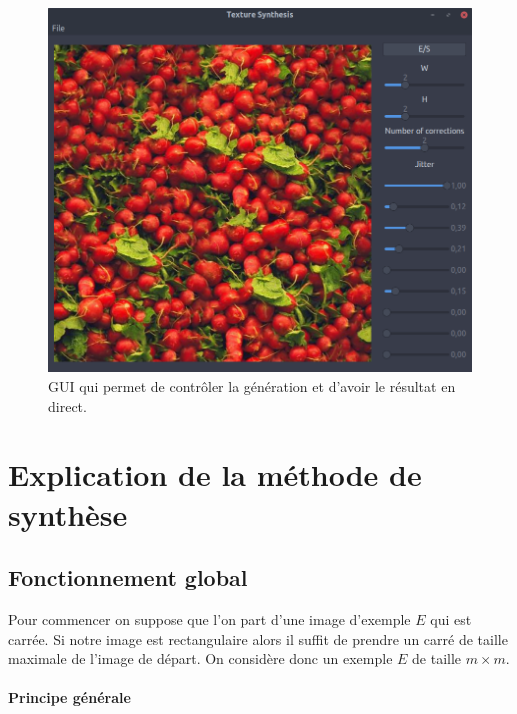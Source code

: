 \documentclass[12pt]{article}
\begin{document}
\begin{figure}
	\centering
	\includegraphics[scale=0.35]{gui.png}
	\captionsetup{justification=centering}
	\caption{GUI qui permet de contrôler la génération et d'avoir le résultat en direct.}
	\label{gui}
\end{figure}

\section{Explication de la méthode de synthèse}

\subsection{Fonctionnement global}

Pour commencer on suppose que l'on part d'une image d'exemple $E$ qui est carrée. Si notre image est rectangulaire alors il suffit de prendre un carré de taille maximale de l'image de départ. On considère donc un exemple $E$ de taille $m \times m$.

\paragraph{Principe générale}
\end{document}
